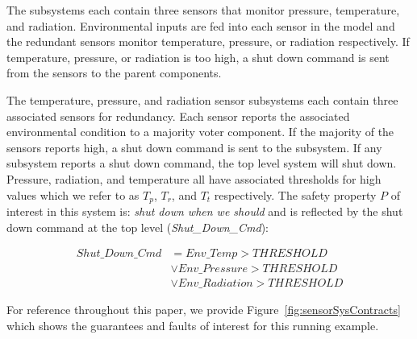 The subsystems each contain three sensors that monitor pressure, temperature, and radiation. Environmental inputs are fed into each sensor in the model and the redundant sensors monitor temperature, pressure, or radiation respectively. If temperature, pressure, or radiation is too high, a shut down command is sent from the sensors to the parent components. 

The temperature, pressure, and radiation sensor subsystems each contain three associated sensors for redundancy. Each sensor reports the associated environmental condition to a majority voter component. If the majority of the sensors reports high, a shut down command is sent to the subsystem. If any subsystem reports a shut down command, the top level system will shut down. Pressure, radiation, and temperature all have associated thresholds for high values which we refer to as $T_p$, $T_r$, and $T_t$ respectively. The safety property $P$ of interest in this system is: \emph{shut down when we should} and is reflected by the shut down command at the top level ({\em Shut\_Down\_Cmd}):

\begin{equation*}
\begin{split}
Shut\_Down\_Cmd &=  Env\_Temp > THRESHOLD\\
  & \lor  Env\_Pressure > THRESHOLD\\
  & \lor Env\_Radiation > THRESHOLD
\end{split}
\end{equation*}

For reference throughout this paper, we provide Figure~\ref{fig:sensorSysContracts} which shows the guarantees and faults of interest for this running example. 

